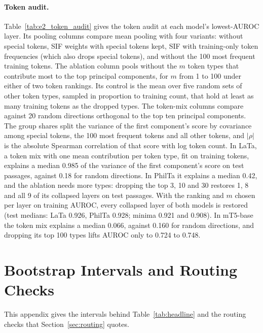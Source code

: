 \documentclass[11pt]{article}
\begin{document}




\paragraph{Token audit.}
Table~\ref{tab:e2_token_audit} gives the token audit at each model's lowest-AUROC layer.
Its pooling columns compare mean pooling with four variants: without special tokens, SIF weights with special tokens kept, SIF with training-only token frequencies (which also drops special tokens), and without the 100 most frequent training tokens.
The ablation column pools without the $m$ token types that contribute most to the top principal components, for $m$ from 1 to 100 under either of two token rankings.
Its control is the mean over five random sets of other token types, sampled in proportion to training count, that hold at least as many training tokens as the dropped types.
The token-mix columns compare against 20 random directions orthogonal to the top ten principal components.
The group shares split the variance of the first component's score by covariance among special tokens, the 100 most frequent tokens and all other tokens, and $|\rho|$ is the absolute Spearman correlation of that score with log token count.
In LaTa, a token mix with one mean contribution per token type, fit on training tokens, explains a median 0.985 of the variance of the first component's score on test passages, against 0.18 for random directions.
In PhilTa it explains a median 0.42, and the ablation needs more types: dropping the top 3, 10 and 30 restores 1, 8 and all 9 of its collapsed layers on test passages.
With the ranking and $m$ chosen per layer on training AUROC, every collapsed layer of both models is restored (test medians: LaTa 0.926, PhilTa 0.928; minima 0.921 and 0.908).
In mT5-base the token mix explains a median 0.066, against 0.160 for random directions, and dropping its top 100 types lifts AUROC only to 0.724 to 0.748.

\FloatBarrier
\section{Bootstrap Intervals and Routing Checks}
\label{app:ci_pq}

This appendix gives the intervals behind Table~\ref{tab:headline} and the routing checks that Section~\ref{sec:routing} quotes.
\end{document}
